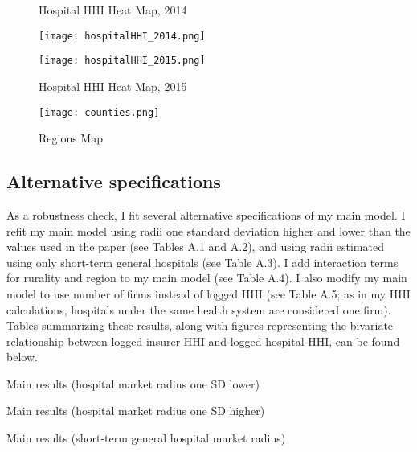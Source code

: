 \documentclass[12pt,letterpaper]{article}
\begin{document}
\begin{figure}[!h]
\begin{center}
\caption{Hospital HHI Heat Map, 2014}\label{Figure 7}
\texttt{[image: hospitalHHI\_2014.png]}
\vspace{5mm}
\caption{Hospital HHI Heat Map, 2015}\label{Figure 8}
\texttt{[image: hospitalHHI\_2015.png]}
\end{center}
\end{figure}

\begin{figure}[!h]
\begin{center}
\caption{Regions Map}
\texttt{[image: counties.png]}
\end{center}
\end{figure}

\restoregeometry

\subsection{Alternative specifications}
As a robustness check, I fit several alternative specifications of my main model. I refit my main model using radii one standard deviation higher and lower than the values used in the paper (see Tables A.1 and A.2), and using radii estimated using only short-term general hospitals (see Table A.3). I add interaction terms for rurality and region to my main model (see Table A.4). I also modify my main model to use number of firms instead of logged HHI (see Table A.5; as in my HHI calculations, hospitals under the same health system are considered one firm). Tables summarizing these results, along with figures representing the bivariate relationship between logged insurer HHI and logged hospital HHI, can be found below.   

\vspace{2cm}

\begin{table}[!hb]
\centering
\caption{Main results (hospital market radius one SD lower)}

\end{table}

\begin{table}
\centering
\caption{Main results (hospital market radius one SD higher)}

\end{table}

\begin{table}
\centering
\caption{Main results (short-term general hospital market radius)}

\end{table}
\end{document}
